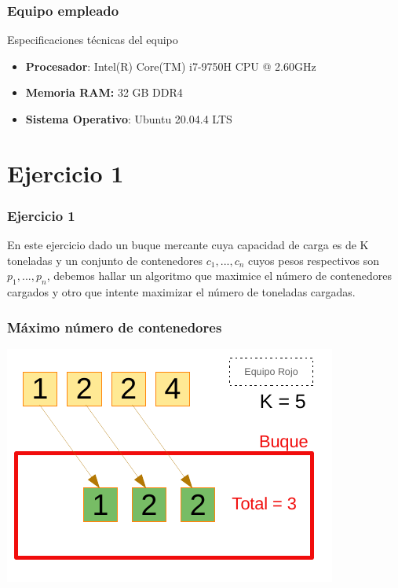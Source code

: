 \documentclass[13pt]{beamer}
\begin{document}
    \begin{frame}
        \frametitle{Equipo empleado}

        \begin{block}{Especificaciones técnicas del equipo}
            \begin{itemize}
                \item \textbf{Procesador}: Intel(R) Core(TM) i7-9750H CPU @ 2.60GHz
                \item \textbf{Memoria RAM:} 32 GB DDR4
                \item \textbf{Sistema Operativo}: Ubuntu 20.04.4 LTS
            \end{itemize}
        \end{block}
    \end{frame}

	\section{Ejercicio 1}


    \begin{frame}
		\frametitle{Ejercicio 1}
		En este ejercicio dado un buque mercante cuya capacidad de carga es de K toneladas y un conjunto de contenedores $c_1,...,c_n$ cuyos
		pesos respectivos son $p_1,...,p_n$, debemos hallar un algoritmo que maximice el número de contenedores cargados y otro que intente 
		maximizar el número de toneladas cargadas.
	\end{frame}

    \begin{frame}
		\frametitle{Máximo número de contenedores}
		\begin{center}
			\includegraphics[scale=1.5]{./img/DibCont1.pdf}
		\end{center}
	\end{frame}
\end{document}
